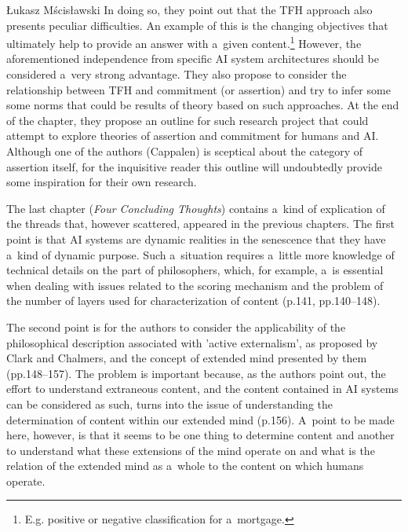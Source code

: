 \begin{newrevengenv}{Łukasz Mścisławski}
In doing so, they point out that the TFH approach also presents peculiar difficulties. An example of this is the changing objectives that ultimately help to provide an answer with a~given content.\footnote{E.g. positive or negative classification for a~mortgage.} However, the aforementioned independence from specific AI system architectures should be considered a~very strong advantage. They also propose to consider the relationship between TFH and commitment (or assertion) and try to infer some some norms that could be results of theory based on such approaches. At the end of the chapter, they propose an outline for such research project that could attempt to explore theories of assertion and commitment for humans and AI. Although one of the authors (Cappalen) is sceptical about the category of assertion itself, for the inquisitive reader this outline will undoubtedly provide some inspiration for their own research.

The last chapter (\textit{Four Concluding Thoughts}) contains a~kind of explication of the threads that, however scattered, appeared in the previous chapters. The first point is that AI systems are dynamic realities in the senescence that they have a~kind of dynamic purpose. Such a~situation requires a~little more knowledge of technical details on the part of philosophers, which, for example, a~is essential when dealing with issues related to the scoring mechanism and the problem of the number of layers used for characterization of content (p.141, pp.140--148).

The second point is for the authors to consider the applicability of the philosophical description associated with 'active externalism', as proposed by Clark and Chalmers, and the concept of extended mind presented by them (pp.148--157). The problem is important because, as the authors point out, the effort to understand extraneous content, and the content contained in AI systems can be considered as such, turns into the issue of understanding the determination of content within our extended mind (p.156). A~point to be made here, however, is that it seems to be one thing to determine content and another to understand what these extensions of the mind operate on and what is the relation of the extended mind as a~whole to the content on which humans operate.


\end{newrevengenv}
